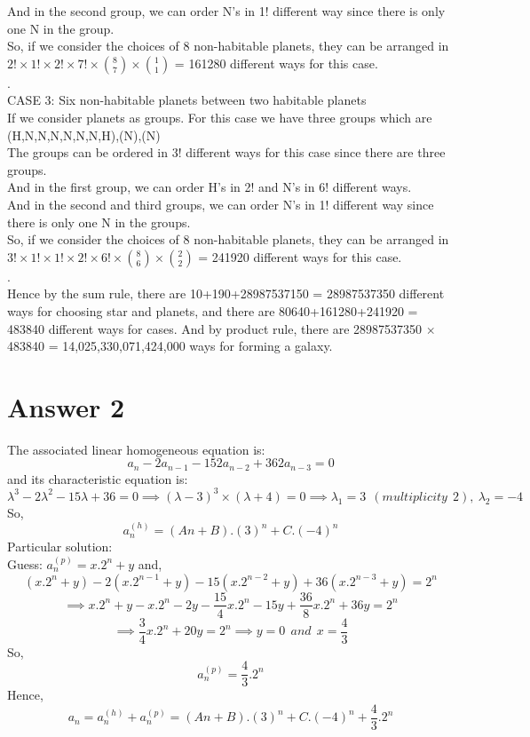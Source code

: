 \documentclass[11pt]{article}
\begin{document}
And in the second group, we can order N's in 1! different way since there is only one N in the group. \\
So, if we consider the choices of 8 non-habitable planets, they can be arranged in $2!\times1!\times2!\times7!\times \binom{8}{7}\times \binom{1}{1}$ = 161280 different ways for this case.\\
.\\
CASE 3: Six non-habitable planets between two habitable planets \\
If we consider planets as groups. For this case we have three groups which are (H,N,N,N,N,N,N,H),(N),(N) \\
The groups can be ordered in 3! different ways for this case since there are three groups.\\
And in the first group, we can order H's in 2! and N's in 6! different ways. \\
And in the second and third groups, we can order N's in 1! different way since there is only one N in the groups. \\
So, if we consider the choices of 8 non-habitable planets, they can be arranged in $3!\times1!\times 1!\times 2!\times6!\times \binom{8}{6}\times \binom{2}{2}$ = 241920 different ways for this case.\\
.\\
Hence by the sum rule, there are 10+190+28987537150 = 28987537350 different ways for choosing star and planets, and there are 80640+161280+241920 = 483840 different ways for cases. And by product rule, there are 28987537350 $\times$ 483840 = 14,025,330,071,424,000 ways for forming a galaxy.
\section*{Answer 2}
The associated linear homogeneous equation is:
$$
a_n - 2a_{n-1} - 152a_{n-2} + 362a_{n-3} = 0
$$
and its characteristic equation is:
$$
\lambda^3-2\lambda^2-15\lambda+36=0
\implies (\lambda-3)^3\times(\lambda+4) = 0
\implies \lambda_1 = 3\ \ (multiplicity\ \ 2),\ \lambda_2 =-4 
$$
So, 
$$
a_n^{(h)} = (An+B).(3)^n + C.(-4)^n
$$
Particular solution:\\
Guess: $a_n^{(p)} = x.2^n + y$ and,
$$
(x.2^n + y) -2(x.2^{n-1} + y) -15(x.2^{n-2} + y) + 36(x.2^{n-3} + y) = 2^n
$$
$$
\implies x.2^n + y -x.2^n -2y - \frac{15}{4}x.2^n -15y + \frac{36}{8}x.2^n + 36y = 2^n
$$
$$
\implies \frac{3}{4}x.2^n + 20y = 2^n \implies y=0\ \ and \ \ x=\frac{4}{3}
$$
So,
$$
a_n^{(p)} = \frac{4}{3}.2^n
$$
Hence,
$$
a_n = a_n^{(h)} + a_n^{(p)} =  (An+B).(3)^n + C.(-4)^n + \frac{4}{3}.2^n
$$
\end{document}
